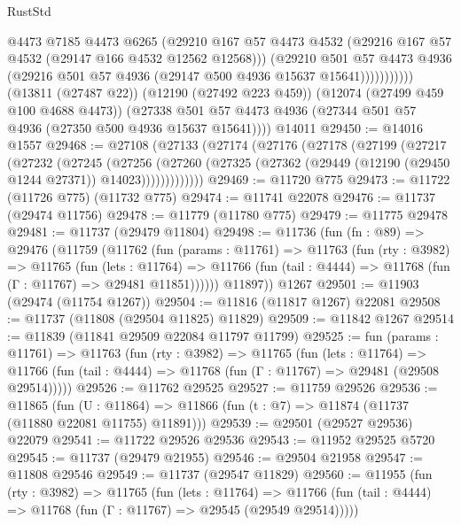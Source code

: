 \begin{lexlean}{RustStd}
\begin{coremodule}
                      @4473
                      @7185
                      @4473
                      @6265
                      (@29210
                        @167
                        @57
                        @4473
                        @4532
                        (@29216 @167 @57 @4532 (@29147 @166 @4532 @12562 @12568)))
                      (@29210
                        @501
                        @57
                        @4473
                        @4936
                        (@29216 @501 @57 @4936 (@29147 @500 @4936 @15637 @15641)))))))))))
      (@13811 (@27487 @22))
      (@12190 (@27492 @223 @459))
      (@12074 (@27499 @459 @100 @4688 @4473))
      (@27338 @501 @57 @4473 @4936 (@27344 @501 @57 @4936 (@27350 @500 @4936 @15637 @15641))))
    @14011
@29450 := @14016 @1557
@29468 := @27108
    (@27133
      (@27174
        (@27176
          (@27178
            (@27199
              (@27217
                (@27232
                  (@27245
                    (@27256
                      (@27260
                        (@27325 (@27362 (@29449 (@12190 (@29450 @1244 @27371)) @14023)))))))))))))
@29469 := @11720 @775
@29473 := @11722 (@11726 @775) (@11732 @775)
@29474 := @11741 @22078
@29476 := @11737 (@29474 @11756)
@29478 := @11779 (@11780 @775)
@29479 := @11775 @29478
@29481 := @11737 (@29479 @11804)
@29498 := @11736
    (fun (fn : @89) =>
    @29476
      (@11759
        (@11762
          (fun (params : @11761) =>
          @11763
            (fun (rty : @3982) =>
            @11765
              (fun (lets : @11764) =>
              @11766 (fun (tail : @4444) => @11768 (fun (Γ : @11767) => @29481 @11851))))))
        @11897))
    @1267
@29501 := @11903 (@29474 (@11754 @1267))
@29504 := @11816 (@11817 @1267) @22081
@29508 := @11737 (@11808 (@29504 @11825) @11829)
@29509 := @11842 @1267
@29514 := @11839 (@11841 @29509 @22084 @11797 @11799)
@29525 := fun (params : @11761) =>
  @11763
    (fun (rty : @3982) =>
    @11765
      (fun (lets : @11764) =>
      @11766 (fun (tail : @4444) => @11768 (fun (Γ : @11767) => @29481 (@29508 @29514)))))
@29526 := @11762 @29525
@29527 := @11759 @29526
@29536 := @11865
    (fun (U : @11864) => @11866 (fun (t : @7) => @11874 (@11737 (@11880 @22081 @11755) @11891)))
@29539 := @29501 (@29527 @29536) @22079
@29541 := @11722 @29526 @29536
@29543 := @11952 @29525 @5720
@29545 := @11737 (@29479 @21955)
@29546 := @29504 @21958
@29547 := @11808 @29546
@29549 := @11737 (@29547 @11829)
@29560 := @11955
    (fun (rty : @3982) =>
    @11765
      (fun (lets : @11764) =>
      @11766 (fun (tail : @4444) => @11768 (fun (Γ : @11767) => @29545 (@29549 @29514)))))

\end{coremodule}
\end{lexlean}
